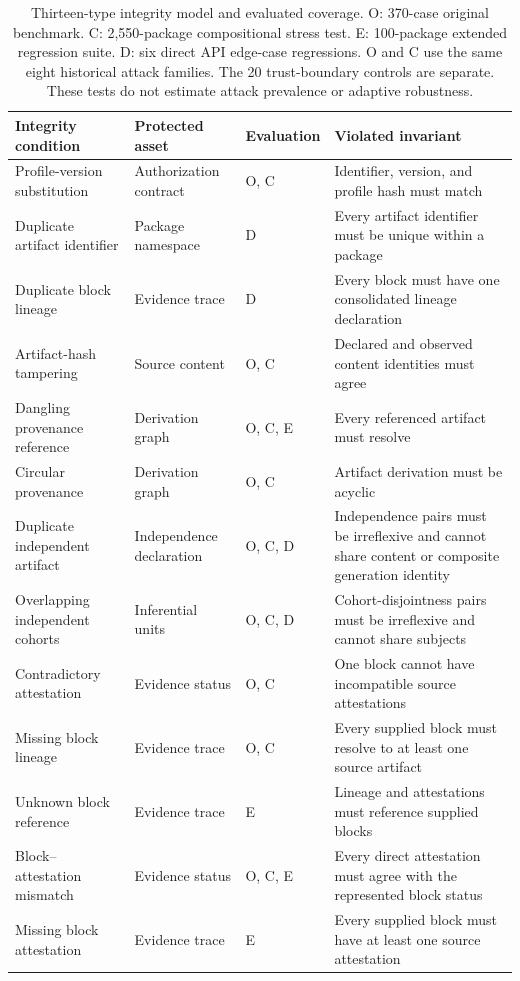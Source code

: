 \begin{table}[!htbp]
\centering
\caption{Thirteen-type integrity model and evaluated coverage. O: 370-case original benchmark. C: 2,550-package compositional stress test. E: 100-package extended regression suite. D: six direct API edge-case regressions. O and C use the same eight historical attack families. The 20 trust-boundary controls are separate. These tests do not estimate attack prevalence or adaptive robustness.}
\label{tab:integrity-threat-model}
\scriptsize
\renewcommand{\arraystretch}{1.06}
\begin{tabularx}{\textwidth}{@{}P{0.24\textwidth}P{0.16\textwidth}P{0.11\textwidth}Y@{}}
\toprule
Integrity condition & Protected asset & Evaluation & Violated invariant \\
\midrule
Profile-version substitution & Authorization contract & O, C & Identifier, version, and profile hash must match \\
Duplicate artifact identifier & Package namespace & D & Every artifact identifier must be unique within a package \\
Duplicate block lineage & Evidence trace & D & Every block must have one consolidated lineage declaration \\
Artifact-hash tampering & Source content & O, C & Declared and observed content identities must agree \\
Dangling provenance reference & Derivation graph & O, C, E & Every referenced artifact must resolve \\
Circular provenance & Derivation graph & O, C & Artifact derivation must be acyclic \\
Duplicate independent artifact & Independence declaration & O, C, D & Independence pairs must be irreflexive and cannot share content or composite generation identity \\
Overlapping independent cohorts & Inferential units & O, C, D & Cohort-disjointness pairs must be irreflexive and cannot share subjects \\
Contradictory attestation & Evidence status & O, C & One block cannot have incompatible source attestations \\
Missing block lineage & Evidence trace & O, C & Every supplied block must resolve to at least one source artifact \\
Unknown block reference & Evidence trace & E & Lineage and attestations must reference supplied blocks \\
Block--attestation mismatch & Evidence status & O, C, E & Every direct attestation must agree with the represented block status \\
Missing block attestation & Evidence trace & E & Every supplied block must have at least one source attestation \\
\bottomrule
\end{tabularx}
\end{table}
